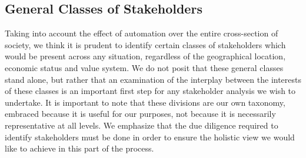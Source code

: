 \subsection{General Classes of Stakeholders}
\label{sec:-general}
Taking into account the effect of automation over the entire 
cross-section of society, we think it is prudent to identify 
certain classes of stakeholders which would be present across 
any situation, regardless of the geographical location, 
economic status and value system.  We do not posit that 
these general classes stand alone, but rather that an 
examination of the interplay between the interests of 
these classes is an important first step for any stakeholder 
analysis we wish to undertake.  It is important to note that 
these divisions are our own taxonomy, embraced because it is useful 
for our purposes, not because it is necessarily representative at 
all levels. We emphasize that the due diligence required to identify 
stakeholders must be done in order to ensure the holistic view we 
would like to achieve in this part of the process.
